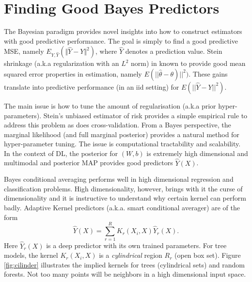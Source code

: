 \documentclass[12pt]{article}
\begin{document}
\section{Finding Good Bayes Predictors}
The Bayesian paradigm provides novel insights into how to construct estimators with good predictive performance. The goal is simply to find a good predictive MSE, namely $E_{Y,\hat{Y}}(\Vert\hat{Y} - Y \Vert^2)$, where $\hat{Y}$ denotes a prediction value. Stein shrinkage (a.k.a regularization with an $L^2$ norm) in known to provide good mean squared error properties in estimation, namely $E(||\hat{\theta} - \theta)||^2)$. These gains translate into predictive performance  (in an iid setting) for $E(||\hat{Y}-Y||^2)$. 

The main issue is how to tune the amount of regularisation (a.k.a prior hyper-parameters).  Stein's unbiased estimator of risk provides a simple empirical rule to address this problem as does cross-validation. From a Bayes perspective, the marginal likelihood (and full marginal posterior) provides a natural method for hyper-parameter tuning. The issue is computational tractability and scalability. In the context of DL, the posterior for $(W,b)$ is  extremely high dimensional and multimodal and posterior MAP provides good predictors $\hat{Y}(X)$. 

Bayes conditional averaging performs well in high dimensional regression and classification problems. High dimensionality, however, brings with it the curse of dimensionality and  it is instructive to understand why certain kernel can perform badly. Adaptive Kernel predictors (a.k.a. smart conditional averager) are of the form 
$$
\hat{Y}(X) = \sum_{r=1}^R K_r ( X_i , X ) \hat{Y}_r (X).
$$
Here $ \hat{Y}_r(X) $ is a deep predictor with its own trained parameters. For tree models, the kernel $ K_r( X_i , X) $ is a \emph{cylindrical} region $ R_r $ (open box set). Figure \ref{fig:cilinder} illustrates the implied kernels for trees (cylindrical sets) and random forests. Not too many points will be neighbors in a high dimensional input space.  
\end{document}
